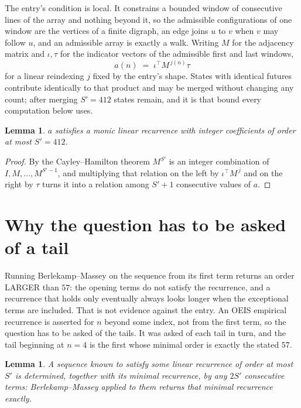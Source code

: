 \documentclass[11pt,a4paper]{article}
\theoremstyle{plain}
\newtheorem{lemma}[theorem]{Lemma}
\theoremstyle{definition}
\begin{document}
The entry's condition is local. It constrains a bounded window of consecutive lines of the
array and nothing beyond it, so the admissible configurations of one window are the vertices of
a finite digraph, an edge joins $u$ to $v$ when $v$ may follow $u$, and an admissible array is
exactly a walk. Writing $M$ for the adjacency matrix and $\iota,\tau$ for the indicator vectors
of the admissible first and last windows,
\[
a(n)\;=\;\iota^{\!\top}M^{\,j(n)}\tau
\]
for a linear reindexing $j$ fixed by the entry's shape. States with identical futures
contribute identically to that product and may be merged without changing any count; after
merging $S'=412$ states remain, and it is that bound every computation below uses.

\begin{lemma}\label{lem:cf}
$a$ satisfies a monic linear recurrence with integer coefficients of order at most $S'=412$.
\end{lemma}

\begin{proof}
By the Cayley--Hamilton theorem $M^{S'}$ is an integer combination of $I,M,\dots,M^{S'-1}$,
and multiplying that relation on the left by $\iota^{\!\top}M^{\,j}$ and on the right by
$\tau$ turns it into a relation among $S'+1$ consecutive values of $a$.
\end{proof}

\section{Why the question has to be asked of a tail}

Running Berlekamp--Massey on the sequence from its first term returns an order LARGER than $57$: the opening terms do not satisfy the recurrence, and a recurrence that holds only eventually always looks longer when the exceptional terms are included. That is not evidence against the entry. An OEIS empirical recurrence is asserted for $n$ beyond some index, not from the first term, so the question has to be asked of the tails. It was asked of each tail in turn, and the tail beginning at $n=4$ is the first whose minimal order is exactly the stated $57$.

\begin{lemma}\label{lem:bm}
A sequence known to satisfy some linear recurrence of order at most $S'$ is determined,
together with its minimal recurrence, by any $2S'$ consecutive terms: Berlekamp--Massey applied
to them returns that minimal recurrence exactly.
\end{lemma}
\end{document}
